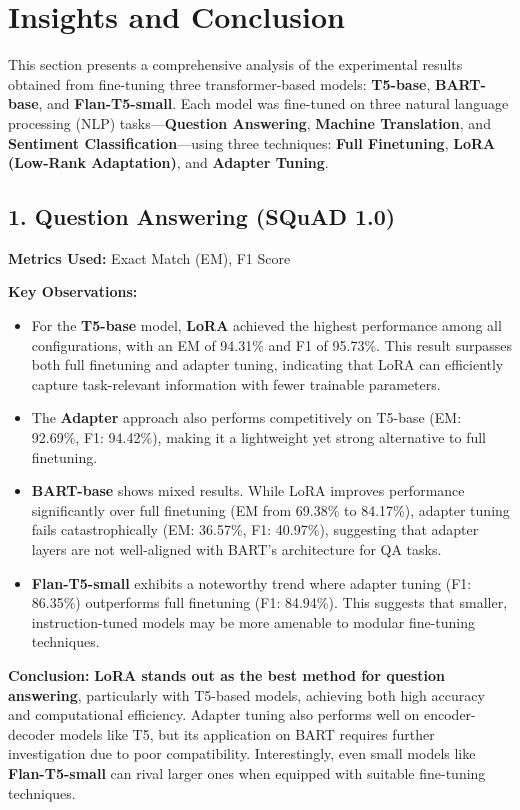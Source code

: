 \section{Insights and Conclusion}

This section presents a comprehensive analysis of the experimental results obtained from fine-tuning three transformer-based models: \textbf{T5-base}, \textbf{BART-base}, and \textbf{Flan-T5-small}. Each model was fine-tuned on three natural language processing (NLP) tasks—\textbf{Question Answering}, \textbf{Machine Translation}, and \textbf{Sentiment Classification}—using three techniques: \textbf{Full Finetuning}, \textbf{LoRA (Low-Rank Adaptation)}, and \textbf{Adapter Tuning}.

\subsection*{1. Question Answering (SQuAD 1.0)}
\textbf{Metrics Used:} Exact Match (EM), F1 Score

\textbf{Key Observations:}
\begin{itemize}
    \item For the \textbf{T5-base} model, \textbf{LoRA} achieved the highest performance among all configurations, with an EM of 94.31\% and F1 of 95.73\%. This result surpasses both full finetuning and adapter tuning, indicating that LoRA can efficiently capture task-relevant information with fewer trainable parameters.
    
    \item The \textbf{Adapter} approach also performs competitively on T5-base (EM: 92.69\%, F1: 94.42\%), making it a lightweight yet strong alternative to full finetuning.
    
    \item \textbf{BART-base} shows mixed results. While LoRA improves performance significantly over full finetuning (EM from 69.38\% to 84.17\%), adapter tuning fails catastrophically (EM: 36.57\%, F1: 40.97\%), suggesting that adapter layers are not well-aligned with BART’s architecture for QA tasks.
    
    \item \textbf{Flan-T5-small} exhibits a noteworthy trend where adapter tuning (F1: 86.35\%) outperforms full finetuning (F1: 84.94\%). This suggests that smaller, instruction-tuned models may be more amenable to modular fine-tuning techniques.
\end{itemize}

\textbf{Conclusion:} 
\textbf{LoRA stands out as the best method for question answering}, particularly with T5-based models, achieving both high accuracy and computational efficiency. Adapter tuning also performs well on encoder-decoder models like T5, but its application on BART requires further investigation due to poor compatibility. Interestingly, even small models like \textbf{Flan-T5-small} can rival larger ones when equipped with suitable fine-tuning techniques.

